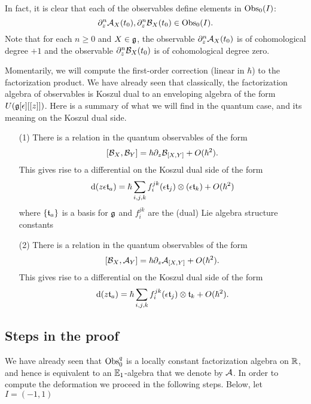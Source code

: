 \documentclass[11pt]{amsart}
\numberwithin{equation}{section}
\def\d{{\rm d}}
\begin{document}
In fact, it is clear that each of the observables define elements in ${\rm Obs}_{0}(I)$:
\[
\partial_z^n \mathcal A_X (t_0) , \partial_z^n \mathcal B_X(t_0) \in {\rm Obs}_{0}(I) .
\]
Note that for each $n \geq 0$ and $X \in \mathfrak g$, the observable $\partial_z^n \mathcal A_X (t_0)$ is of cohomological degree $+1$ and the observable $\partial_z^n \mathcal B_X (t_0)$ is of cohomological degree zero. 

\def\ft{{\frak t}}

Momentarily, we will compute the first-order correction (linear in $\hbar$) to the factorization product.
We have already seen that classically, the factorization algebra of observables is Koszul dual to an enveloping algebra of the form $U(\mathfrak g[\epsilon][[z]])$. 
Here is a summary of what we will find in the quantum case, and its meaning on the Koszul dual side. 
\begin{itemize}
\item[(1)] 
There is a relation in the quantum observables of the form
\[
[\mathcal B_X, \mathcal B_Y] = \hbar \partial_z \mathcal B_{[X,Y]} + O(\hbar^2) .
\]
This gives rise to a differential on the Koszul dual side of the form
\[
\d (z \epsilon \ft_a) = \hbar \sum_{i,j,k} f_i^{jk} (\epsilon \ft_{j}) \otimes (\epsilon \ft_{k}) + O(\hbar^2)
\]
where $\{\ft_a\}$ is a basis for $\mathfrak g$ and $f_i^{jk}$ are the (dual) Lie algebra structure constants
\item[(2)] 
There is a relation in the quantum observables of the form
\[ 
[\mathcal B_X, \mathcal A_Y] = \hbar \partial_z \mathcal A_{[X,Y]} + O(\hbar^2) .
\]
This gives rise to a differential on the Koszul dual side of the form
\[
\d (z \ft_a) = \hbar \sum_{i,j,k} f_i^{jk} (\epsilon \ft_{j}) \otimes \ft_{k} + O(\hbar^2) .
\]
\end{itemize}

\subsection{Steps in the proof}

We have already seen that ${\rm Obs}^q_0$ is a locally constant factorization algebra on $\mathbb R$, and hence is equivalent to an $\mathbb E_1$-algebra that we denote by $\mathcal A$. 
In order to compute the deformation we proceed in the following steps. 
Below, let $I = (-1, 1)$ 
\end{document}
